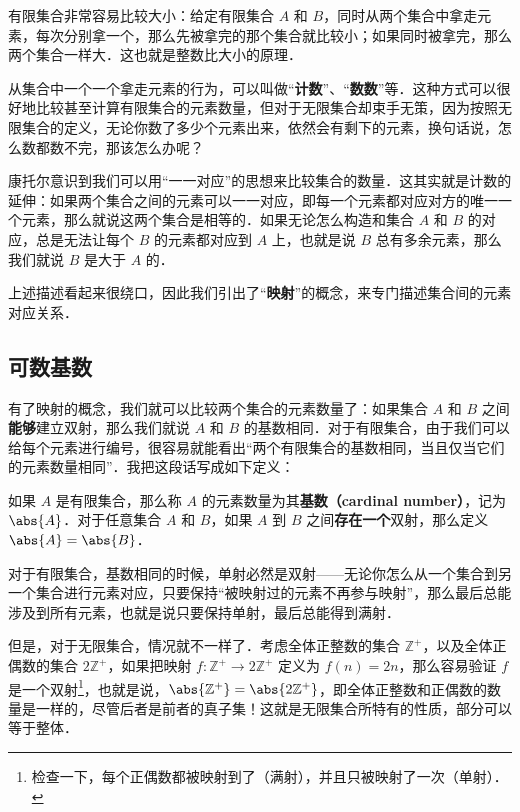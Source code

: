 有限集合非常容易比较大小：给定有限集合 $A$ 和 $B$，同时从两个集合中拿走元素，每次分别拿一个，那么先被拿完的那个集合就比较小；如果同时被拿完，那么两个集合一样大．这也就是整数比大小的原理．

从集合中一个一个拿走元素的行为，可以叫做“\textbf{计数}”、“\textbf{数数}”等．这种方式可以很好地比较甚至计算有限集合的元素数量，但对于无限集合却束手无策，因为按照无限集合的定义，无论你数了多少个元素出来，依然会有剩下的元素，换句话说，怎么数都数不完，那该怎么办呢？

康托尔意识到我们可以用“一一对应”的思想来比较集合的数量．这其实就是计数的延伸：如果两个集合之间的元素可以一一对应，即每一个元素都对应对方的唯一一个元素，那么就说这两个集合是相等的．如果无论怎么构造和集合 $A$ 和 $B$ 的对应，总是无法让每个 $B$ 的元素都对应到 $A$ 上，也就是说 $B$ 总有多余元素，那么我们就说 $B$ 是大于 $A$ 的．

上述描述看起来很绕口，因此我们引出了“\textbf{映射}”的概念，来专门描述集合间的元素对应关系．



\subsection{可数基数}\label{CardiN_sub1}


有了映射的概念，我们就可以比较两个集合的元素数量了：如果集合 $A$ 和 $B$ 之间\textbf{能够}建立双射，那么我们就说 $A$ 和 $B$ 的基数相同．对于有限集合，由于我们可以给每个元素进行编号，很容易就能看出“两个有限集合的基数相同，当且仅当它们的元素数量相同”．我把这段话写成如下定义：

\begin{definition}{}\label{CardiN_def1}
如果 $A$ 是有限集合，那么称 $A$ 的元素数量为其\textbf{基数（cardinal number）}，记为 $\abs{A}$．对于任意集合 $A$ 和 $B$，如果 $A$ 到 $B$ 之间\textbf{存在一个}双射，那么定义 $\abs{A}=\abs{B}$．
\end{definition}


对于有限集合，基数相同的时候，单射必然是双射——无论你怎么从一个集合到另一个集合进行元素对应，只要保持“被映射过的元素不再参与映射”，那么最后总能涉及到所有元素，也就是说只要保持单射，最后总能得到满射．

但是，对于无限集合，情况就不一样了．考虑全体正整数的集合 $\mathbb{Z}^+$，以及全体正偶数的集合 $2\mathbb{Z}^+$，如果把映射 $f:\mathbb{Z}^+\rightarrow2\mathbb{Z}^+$ 定义为 $f(n)=2n$，那么容易验证 $f$ 是一个双射\footnote{检查一下，每个正偶数都被映射到了（满射），并且只被映射了一次（单射）．}，也就是说，$\abs{\mathbb{Z}^+}=\abs{2\mathbb{Z}^+}$，即全体正整数和正偶数的数量是一样的，尽管后者是前者的真子集！这就是无限集合所特有的性质，部分可以等于整体．

